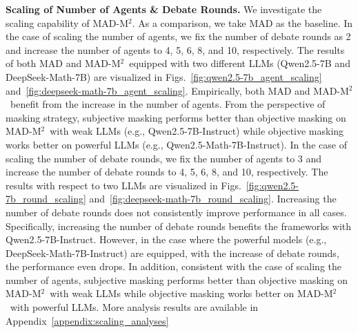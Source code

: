 \documentclass{article} %
\newcommand{\methodname}{MAD-M$^2$}
\theoremstyle{plain}
\begin{document}

\textbf{Scaling of Number of Agents \& Debate Rounds.} We investigate the scaling capability of \methodname. As a comparison, we take MAD as the baseline.
In the case of scaling the number of agents, we fix the number of debate rounds as 2 and increase the number of agents to 4, 5, 6, 8, and 10, respectively. The results of both MAD and \methodname\ equipped with two different LLMs (Qwen2.5-7B and DeepSeek-Math-7B) are visualized in Figs.~\ref{fig:qwen2.5-7b_agent_scaling} and~\ref{fig:deepseek-math-7b_agent_scaling}. Empirically, both MAD and \methodname\ benefit from the increase in the number of agents. From the perspective of masking strategy, subjective masking performs better than objective masking on \methodname\ with weak LLMs (e.g., Qwen2.5-7B-Instruct) while objective masking works better on powerful LLMs (e.g., Qwen2.5-Math-7B-Instruct). 
In the case of scaling the number of debate rounds, we fix the number of agents to 3 and increase the number of debate rounds to 4, 5, 6, 8, and 10, respectively. The results with respect to two LLMs are visualized in Figs.~\ref{fig:qwen2.5-7b_round_scaling} and~\ref{fig:deepseek-math-7b_round_scaling}. Increasing the number of debate rounds does not consistently improve performance in all cases. Specifically, increasing the number of debate rounds benefits the frameworks with Qwen2.5-7B-Instruct. However, in the case where the powerful models (e.g., DeepSeek-Math-7B-Instruct) are equipped, with the increase of debate rounds, the performance even drops. In addition, consistent with the case of scaling the number of agents, subjective masking performs better than objective masking on \methodname\ with weak LLMs while objective masking works better on \methodname\ with powerful LLMs. More analysis results are available in Appendix~\ref{appendix:scaling_analyses} %
\end{document}
